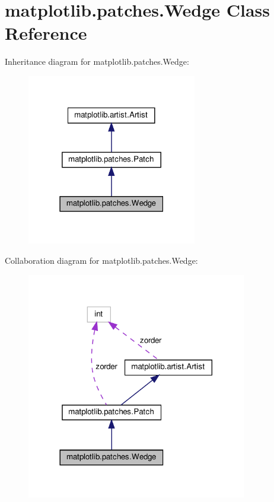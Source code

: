 \hypertarget{classmatplotlib_1_1patches_1_1Wedge}{}\section{matplotlib.\+patches.\+Wedge Class Reference}
\label{classmatplotlib_1_1patches_1_1Wedge}


Inheritance diagram for matplotlib.\+patches.\+Wedge\+:
\nopagebreak
\begin{figure}[H]
\begin{center}
\leavevmode
\includegraphics[width=210pt]{classmatplotlib_1_1patches_1_1Wedge__inherit__graph}
\end{center}
\end{figure}


Collaboration diagram for matplotlib.\+patches.\+Wedge\+:
\nopagebreak
\begin{figure}[H]
\begin{center}
\leavevmode
\includegraphics[width=272pt]{classmatplotlib_1_1patches_1_1Wedge__coll__graph}
\end{center}
\end{figure}
